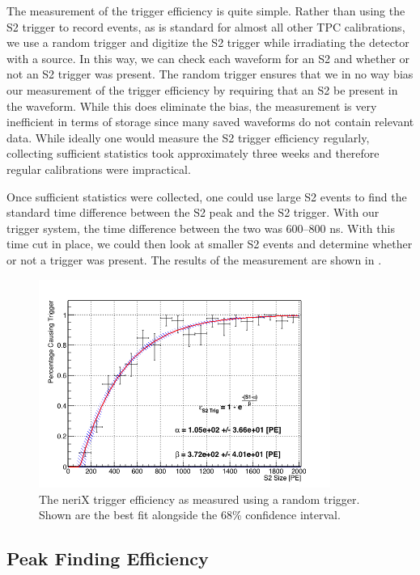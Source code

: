 The measurement of the trigger efficiency is quite simple.  Rather than using the S2 trigger to record events, as is standard for almost all other TPC calibrations, we use a random trigger and digitize the S2 trigger while irradiating the detector with a \sodium{} source.  In this way, we can check each waveform for an S2 and whether or not an S2 trigger was present.  The random trigger ensures that we in no way bias our measurement of the trigger efficiency by requiring that an S2 be present in the waveform.  While this does eliminate the bias, the measurement is very inefficient in terms of storage since many saved waveforms do not contain relevant data.  While ideally one would measure the S2 trigger efficiency regularly, collecting sufficient statistics took approximately three weeks and therefore regular calibrations were impractical.

Once sufficient statistics were collected, one could use large S2 events to find the standard time difference between the S2 peak and the S2 trigger.  With our trigger system, the time difference between the two was 600--800 ns.  With this time cut in place, we could then look at smaller S2 events and determine whether or not a trigger was present.  The results of the measurement are shown in .

\begin{figure}[t]
        \centering
	\includegraphics[width=0.85\textwidth]{nerix_trigger_efficiency}
	\caption{The neriX trigger efficiency as measured using a random trigger.  Shown are the best fit alongside the 68\% confidence interval.}
	\label{fig:nerix_trigger_efficiency}
\end{figure}



\subsection{Peak Finding Efficiency}











